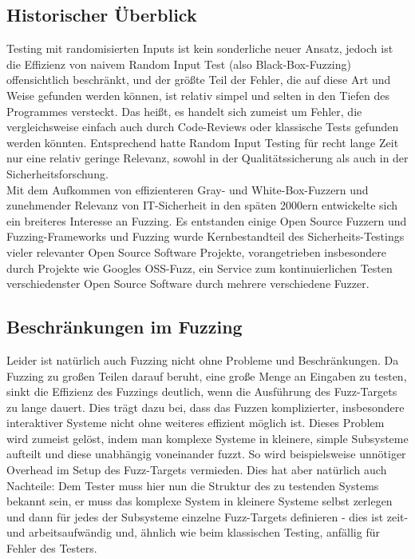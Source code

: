 \documentclass[a4paper]{article}
\begin{document}
\subsection{Historischer Überblick}
Testing mit randomisierten Inputs ist kein sonderliche neuer Ansatz\cite{randominput}, jedoch ist die Effizienz von naivem Random Input Test (also Black-Box-Fuzzing) offensichtlich beschränkt, und der größte Teil der Fehler, die auf diese Art und Weise gefunden werden können, ist relativ simpel und selten in den Tiefen des Programmes versteckt. 
Das heißt, es handelt sich zumeist um Fehler, die vergleichsweise einfach auch durch Code-Reviews oder klassische Tests gefunden werden könnten. 
Entsprechend hatte Random Input Testing für recht lange Zeit nur eine relativ geringe Relevanz, sowohl in der Qualitätssicherung als auch in der Sicherheitsforschung.\\
Mit dem Aufkommen von effizienteren Gray- und White-Box-Fuzzern und zunehmender Relevanz von IT-Sicherheit in den späten 2000ern entwickelte sich ein breiteres Interesse an Fuzzing\cite{fuzzinghistory}. Es entstanden einige Open Source Fuzzern und Fuzzing-Frameworks und Fuzzing wurde Kernbestandteil des Sicherheits-Testings vieler relevanter Open Source Software Projekte, vorangetrieben insbesondere durch Projekte wie Googles OSS-Fuzz, ein Service zum kontinuierlichen Testen verschiedenster Open Source Software durch mehrere verschiedene Fuzzer.

\subsection{Beschränkungen im Fuzzing}
Leider ist natürlich auch Fuzzing nicht ohne Probleme und Beschränkungen. 
Da Fuzzing zu großen Teilen darauf beruht, eine große Menge an Eingaben zu testen, sinkt die Effizienz des Fuzzings deutlich, wenn die Ausführung des Fuzz-Targets zu lange dauert. 
Dies trägt dazu bei, dass das Fuzzen komplizierter, insbesondere interaktiver Systeme nicht ohne weiteres effizient möglich ist. 
Dieses Problem wird zumeist gelöst, indem man komplexe Systeme in kleinere, simple Subsysteme aufteilt und diese unabhängig voneinander fuzzt. So wird beispielsweise unnötiger Overhead im Setup des Fuzz-Targets vermieden. 
Dies hat aber natürlich auch Nachteile: Dem Tester muss hier nun die Struktur des zu testenden Systems bekannt sein, er muss das komplexe System in kleinere Systeme selbst zerlegen und dann für jedes der Subsysteme einzelne Fuzz-Targets definieren - dies ist zeit- und arbeitsaufwändig und, ähnlich wie beim klassischen Testing, anfällig für Fehler des Testers. 
\end{document}

